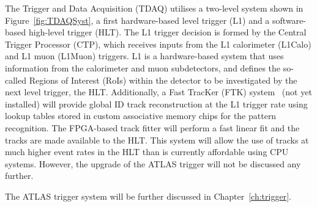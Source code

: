 		The Trigger and Data Acquisition (TDAQ) utilises a two-level system shown in Figure~\ref{fig:TDAQSyst}, a first hardware-based level trigger (L1) and a software-based high-level trigger (HLT). The L1 trigger decision is formed by the Central Trigger Processor (CTP), which receives inputs from the L1 calorimeter (L1Calo) and L1 muon (L1Muon) triggers. L1 is a hardware-based system that uses information from the calorimeter and muon subdetectors, and defines the so-called Regions of Interest (RoIs) within the detector to be investigated by the next level trigger, the HLT. Additionally, a Fast TracKer (FTK) system~\cite{FTKTDR} (not yet installed) will provide global ID track reconstruction at the L1 trigger rate using lookup tables stored in custom associative memory chips for the pattern recognition. The FPGA-based track fitter will perform a fast linear fit and the tracks are made available to the HLT. This system will allow the use of tracks at much higher event rates in the HLT than is currently affordable using CPU systems. However, the upgrade of the ATLAS trigger will not be discussed any further.

		The ATLAS trigger system will be further discussed in Chapter~\ref{ch:trigger}.